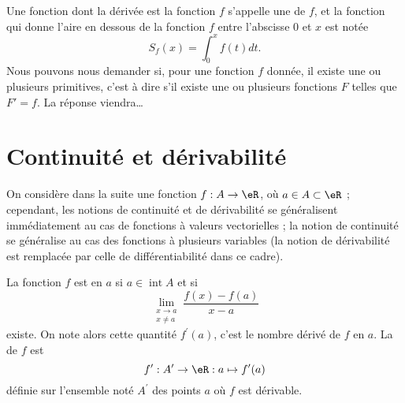 Une fonction dont la dérivée est la fonction $f$ s'appelle une  de $f$, et la fonction qui donne l'aire en dessous de la fonction $f$ entre l'abscisse $0$ et $x$ est notée
\begin{equation}
	S_f(x)=\int_0^xf(t)dt.
\end{equation}
Nous pouvons nous demander si, pour une fonction $f$ donnée, il existe une ou plusieurs primitives, c'est à dire s'il existe une ou plusieurs fonctions $F$ telles que $F'=f$. La réponse viendra\ldots

\section{Continuité et dérivabilité}
\label{seccontetderiv}

On considère dans la suite une fonction $f : A \to \eR$, où $a \in A \subset \eR$ ; cependant, les notions de continuité et de dérivabilité se généralisent immédiatement au cas de fonctions à valeurs vectorielles ; la notion de continuité se généralise au cas des fonctions à plusieurs variables (la notion de dérivabilité est remplacée par celle de différentiabilité dans ce cadre).

\begin{definition}
    La fonction $f$ est  en \( a\) si $a \in
  \operatorname{int} A$ et si
  \begin{equation*}
    \lim_{\substack{x\rightarrow a\\x\neq a}} \frac{f(x)-f(a)}{x-a}
  \end{equation*}
  existe. On note alors cette quantité $f^\prime(a)$, c'est le nombre
  dérivé de $f$ en $a$. La  de $f$ est
  \begin{equation*}
    f^\prime : A^\prime \to \eR : a \mapsto f^\prime(a)
  \end{equation*}
  définie sur l'ensemble noté $A^\prime$ des points $a$ où $f$ est
  dérivable.
\end{definition}

